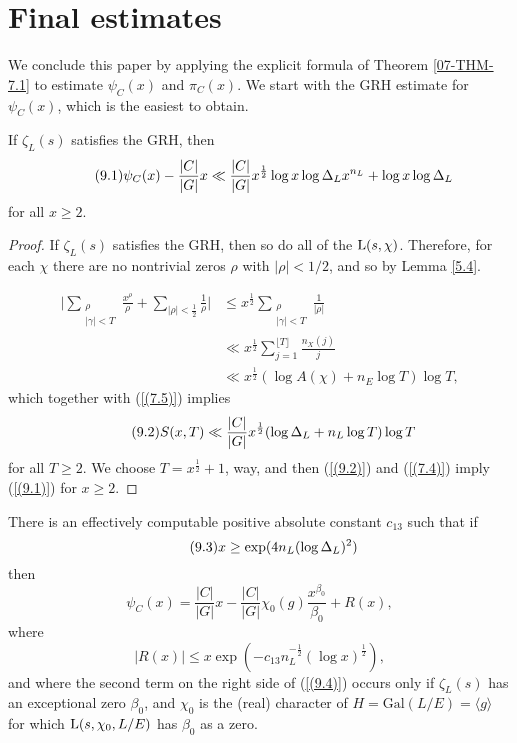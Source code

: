 \documentclass[./main]{subfiles}
\begin{document}
\section{Final estimates}

We conclude this paper by applying the explicit formula of Theorem \ref{07-THM-7.1} to estimate $\psi_C(x)$ and $\pi_C(x)$.
We start with the GRH estimate for $\psi_C(x)$, which is the easiest to obtain.

\begin{theorem}\label{09-THM-9.1}
If $\zeta_L(s)$ satisfies the GRH, then 
\[\tag{9.1}\label{(9.1)}
\psi_C(x) - \frac{|C|}{|G|} x \ll \frac{|C|}{|G|} x^{\frac{1}{2}} \log x \log \Delta_L x^{n_L} + \log x \log \Delta_L 
\]
for all $x \geq 2$.
\end{theorem}
\begin{proof}
If $\zeta_L(s)$ satisfies the GRH, then so do all of the $\operatorname{L}(s, \chi)$.
Therefore, for each $\chi$ there are no nontrivial zeros $\rho$ with $|\rho| < 1/2$, and so by Lemma \ref{5.4}.

\begin{align*}
    \Bigg| \sum_{\substack{\rho \\ |\gamma| < T}} \frac{x^\rho}{\rho} + \sum_{|\rho| < \frac{1}{2}} \frac{1}{\rho} \Bigg| & \leq x^{\frac{1}{2}} \sum_{\substack{\rho \\ |\gamma| < T}} \frac{1}{|\rho|} \\
    & \ll x^{\frac{1}{2}} \sum_{j=1}^{\lfloor T\rfloor} \frac{n_X(j)}{j} \\
    & \ll x^{\frac{1}{2}} (\log A(\chi) + n_E \log T)\log T,
\end{align*}
which together with (\ref{(7.5)}) implies 
\[\tag{9.2}\label{(9.2)}
S(x, T) \ll \frac{|C|}{|G|} x^{\frac{1}{2}} (\log \Delta_L  + n_L \log T) \log T
\]
for all $T \geq 2$.
We choose $T = x^\frac{1}{2} + 1$, way, and then (\ref{(9.2)}) and (\ref{(7.4)}) imply (\ref{(9.1)}) for $x \geq 2$.
\end{proof}

\begin{theorem}\label{09-THM-9.2}
There is an effectively computable positive absolute constant $c_{13}$ such that if 
\[\tag{9.3}\label{(9.3)}
x \geq \exp(4n_L (\log \Delta_L )^2)
\]
then
\[\tag{9.4}\label{(9.4)}
\psi_C(x) = \frac{|C|}{|G|}x - \frac{|C|}{|G|} \chi_0(g) \frac{x^{\beta_0}}{\beta_0} + R(x),
\]
where
\[
|R(x)| \leq x \exp(-c_{13} n_{L}^{-\frac{1}{2}} (\log x)^\frac{1}{2}),
\]
and where the second term on the right side of (\ref{(9.4)}) occurs only if $\zeta_L(s)$ has an exceptional zero $\beta_0$, and $\chi_0$ is the (real) character of $H = \mathrm{Gal}(L/E) = \langle g \rangle$ for which $\operatorname{L}(s, \chi_0, L/E)$ has $\beta_0$ as a zero.
\end{theorem}
\end{document}
